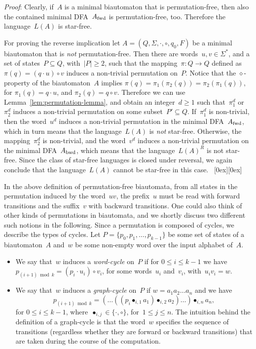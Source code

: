 \documentclass[submission]{eptcs}
\newcommand{\dfa}{\textrm{DFA}}
\newcommand{\fwd}{{\textnormal{fwd}}}
\newcommand{\bwd}{{\textnormal{bwd}}}
\newcommand{\abs}[1]{\left\lvert{#1}\right\rvert}
\newcommand*{\qed}{\raisebox{0.5ex}[0ex][0ex]{\framebox[1ex][l]{}}}
\newenvironment{proof}{\par\noindent
  {\rmfamily\itshape\mdseries Proof\/}:\hspace{\labelsep}\ignorespaces}{\mbox{}\nolinebreak\hfill~{\qed}
  \medbreak
}
\begin{document}
\begin{proof}
  Clearly, if~$A$ is a minimal biautomaton that is permutation-free,
  then also the contained minimal \dfa~$A_\fwd$ is permutation-free,
  too.  Therefore the language~$L(A)$ is star-free.  

  For proving the reverse implication let
  $A=(Q,\Sigma,\cdot,\circ,q_0,F)$ be a minimal biautomaton that is
  \emph{not} permutation-free.  Then there are words~$u,v\in\Sigma^*$,
  and a set of states~$P\subseteq Q$, with~$\abs P \geq 2$, such that
  the mapping~$\pi\colon Q\to Q$ defined as $\pi(q) = (q\cdot u)\circ
  v$ induces a non-trivial permutation on~$P$.  Notice that the
  $\diamond$-property of the biautomaton~$A$ implies
  $\pi(q)=\pi_1(\pi_2(q))=\pi_2(\pi_1(q))$, for $\pi_1(q) = q\cdot u$,
  and $\pi_2(q) = q\circ v$.  Therefore we can use
  Lemma~\ref{lem:permutation-lemma}, and obtain an integer~$d\geq 1$
  such that~$\pi_1^d$ or~$\pi_2^d$ induces a non-trivial permutation
  on some subset~$P'\subseteq Q$.  If~$\pi_1^d$ is non-trivial, then
  the word~$u^d$ induces a non-trivial permutation in the minimal
  \dfa~$A_\fwd$, which in turn means that the language~$L(A)$ is
  \emph{not} star-free.  Otherwise, the mapping~$\pi_2^d$ is
  non-trivial, and the word~$v^d$ induces a non-trivial permutation on
  the minimal \dfa~$A_\bwd$, which means that the language~$L(A)^R$ is
  not star-free.  Since the class of star-free languages is closed
  under reversal, we again conclude that the language~$L(A)$ cannot be
  star-free in this case.
\end{proof}

In the above definition of permutation-free biautomata, from all
states in the permutation induced by the word~$uv$, the prefix~$u$
must be read with forward transitions and the suffix~$v$ with backward
transitions.  
One could also think of other kinds of permutations in biautomata, and
we shortly discuss two different such notions in the following.  Since
a permutation is composed of cycles, we describe the types of cycles.
Let $P=\{p_0, p_1, \dots, p_{k-1}\}$ be some set of states of a
biautomaton~$A$ and~$w$ be some non-empty word over the input alphabet
of~$A$.
\begin{itemize}
\item We say that~$w$ induces a \emph{word-cycle} on~$P$ if for $0\leq
  i\leq k-1$ we have $p_{(i+1)\bmod k} = (p_i\cdot u_i)\circ v_i$, for
  some words~$u_i$ and~$v_i$, with~$u_iv_i=w$.
\item We say that~$w$ induces a \emph{graph-cycle} on~$P$ if
  $w=a_1a_2\dots a_n$ and we have
\[ p_{(i+1)\bmod k} = (\dots((p_i \bullet_{i,1} a_1) \bullet_{i,2}
  a_2)\dots)\bullet_{i,n} a_n, \]
for $0\leq i\leq k-1$, where~$\bullet_{i,j}\in \{\cdot,\circ\}$,
  for~$1\leq j\leq n$. The intuition behind the definition of a
  graph-cycle is that the word~$w$ specifies the sequence of
  transitions (regardless whether they are forward or backward
  transitions) that are taken during the course of the computation.
\end{itemize}
\end{document}
